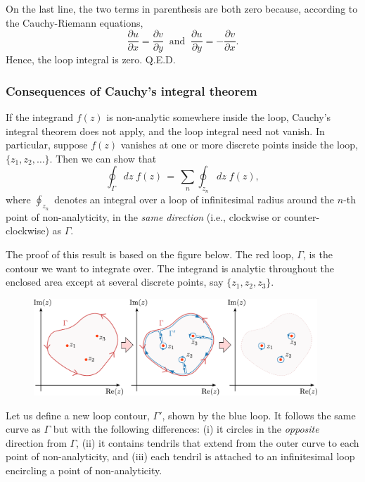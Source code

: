 \documentclass[10pt,a4paper]{article}
\begin{document}
On the last line, the two terms in parenthesis are both zero because,
according to the Cauchy-Riemann equations,
\begin{equation}
\frac{\partial u}{\partial x} = \frac{\partial v}{\partial y}\;\;\mathrm{and}\;\; \frac{\partial u}{\partial y} = -\frac{\partial v}{\partial x}.
\end{equation}
Hence, the loop integral is zero. Q.E.D.

\subsubsection{Consequences of Cauchy's integral theorem}
\label{consequences-of-cauchys-integral-theorem}

If the integrand $f(z)$ is non-analytic somewhere inside the loop,
Cauchy's integral theorem does not apply, and the loop integral need not
vanish. In particular, suppose $f(z)$ vanishes at one or more discrete
points inside the loop, $\{z_1, z_2, \dots\}$. Then we can show that
\begin{equation}
\oint_\Gamma dz\; f(z) \,=\, \sum_{n} \oint_{z_n} dz\; f(z),
\end{equation}
where $\oint_{z_n}$ denotes an integral over a loop of infinitesimal
radius around the $n$-th point of non-analyticity, in the \emph{same
direction} (i.e., clockwise or counter-clockwise) as $\Gamma$.

The proof of this result is based on the figure below. The red loop,
$\Gamma$, is the contour we want to integrate over. The integrand is
analytic throughout the enclosed area except at several discrete points,
say $\{z_1, z_2, z_3\}$.

\begin{figure}[H]
  \centering\includegraphics[width=0.95\textwidth]{contour_deformation}
\end{figure}

\noindent
Let us define a new loop contour, $\Gamma'$, shown by the blue
loop. It follows the same curve as $\Gamma$ but with the following
differences: (i) it circles in the \emph{opposite} direction from
$\Gamma$, (ii) it contains tendrils that extend from the outer curve
to each point of non-analyticity, and (iii) each tendril is attached
to an infinitesimal loop encircling a point of non-analyticity.
\end{document}
